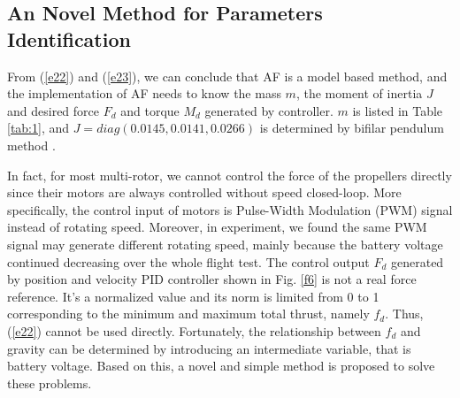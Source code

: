 \documentclass[letterpaper, 10 pt, conference]{ieeeconf}  %
\begin{document}
\subsection{An Novel Method for Parameters Identification}

From (\ref{e22}) and (\ref{e23}), we can conclude that AF is a model based method, and the implementation of AF needs to know the mass $m$, the moment of inertia $J$ and desired force $F_d$ and torque $M_d$ generated by controller.
$m$ is listed in Table \ref{tab:1}, and $J=diag(0.0145,0.0141,0.0266)$ is determined by bifilar pendulum method \cite{Soule1934}.

In fact, for most multi-rotor, we cannot control the force of the propellers directly since their motors are always controlled without speed closed-loop.
More specifically, the control input of motors is Pulse-Width Modulation (PWM) signal instead of rotating speed.
Moreover, in experiment, we found the same PWM signal may generate different rotating speed, mainly because the battery voltage continued decreasing over the whole flight test.
The control output $F_d$ generated by position and velocity PID controller shown in Fig. \ref{f6} is not a real force reference.
It’s a normalized value and its norm is limited from 0 to 1 corresponding to the minimum and maximum total thrust, namely $f_d$.
Thus, (\ref{e22}) cannot be used directly.
Fortunately, the relationship between $f_d$ and gravity can be determined by introducing an intermediate variable, that is battery voltage.
Based on this, a novel and simple method is proposed to solve these problems.
\end{document}
